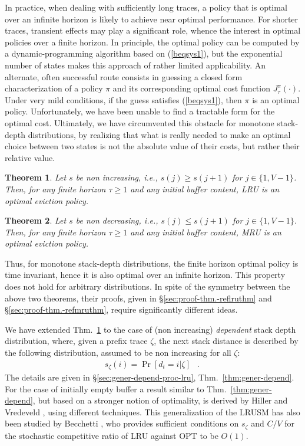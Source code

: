 \documentclass[11pt,a4paper]{article}
\DeclareMathOperator{\Pb}{Pr}
\DeclareMathOperator{\mf}{\enspace .}
\newtheorem{theorem}{Theorem}
\theoremstyle{definition}
\theoremstyle{remark}
\begin{document}
In practice, when dealing with sufficiently long traces, a policy that
is optimal over an infinite horizon is likely to achieve near optimal
performance.  For shorter traces, transient effects may play a
significant role, whence the interest in optimal policies over a
finite horizon.  In principle, the optimal policy can be computed by a
dynamic-programming algorithm based on (\ref{beqsys1}), but the
exponential number of states makes this approach of rather limited
applicability.  An alternate, often successful route consists in
guessing a closed form characterization of a policy $\pi$ and its
corresponding optimal cost function $J^{\pi}_{\tau}(\cdot)$.  Under
very mild conditions, if the guess satisfies (\ref{beqsys1}), then
$\pi$ is an optimal policy. Unfortunately, we have been unable to find
a tractable form for the optimal cost. Ultimately, we have
circumvented this obstacle for monotone stack-depth distributions, by
realizing that what is really needed to make an optimal choice between
two states is not the absolute value of their costs, but rather their
relative value.
\begin{theorem}\label{lruthm}
  Let $s$ be non increasing, i.e., $s(j)\geq s(j+1)$ for $ j\in\{1,
  V-1\}$.  Then, for any finite horizon $\tau \geq 1$ and any initial
  buffer content, LRU is an optimal eviction policy.
\end{theorem}
\begin{theorem}\label{mruthm}
  Let $s$ be non decreasing, i.e., $s(j)\leq s(j+1)$ for $ j\in\{1,
  V-1\}$.  Then, for any finite horizon $\tau \geq 1$ and any initial
  buffer content, MRU is an optimal eviction policy.
\end{theorem}
Thus, for monotone stack-depth distributions, the finite horizon
optimal policy is time invariant, hence it is also optimal over an
infinite horizon.  This property does not hold for arbitrary
distributions.  In spite of the symmetry between the above two
theorems, their proofs, given in \S\ref{sec:proof-thm.-reflruthm} and
\S\ref{sec:proof-thm.-refmruthm}, require significantly different
ideas.

We have extended Thm.~\ref{lruthm} to the case of (non increasing)
\emph{dependent} stack depth distribution, where, given a prefix trace
$\zeta$, the next stack distance is described by the following
distribution, assumed to be non increasing for all $\zeta$:
\begin{align}
  s_\zeta(i) = \Pb\left[d_t = i | \zeta \right] \mf
\end{align}
The details are given in \S\ref{sec:gener-depend-proc-lru},
Thm.~\ref{thm:gener-depend}. For the case of initially empty buffer a
result similar to Thm.~\ref{thm:gener-depend}, but based on a stronger
notion of optimality, is derived by Hiller and Vredeveld
\cite{HillerV09}, using different techniques. This generalization of
the LRUSM has also been studied by Becchetti \cite{Becchetti04}, who
provides sufficient conditions on $s_\zeta$ and $C/V$ for the
stochastic competitive ratio of LRU against OPT to be $O(1)$.
\end{document}
